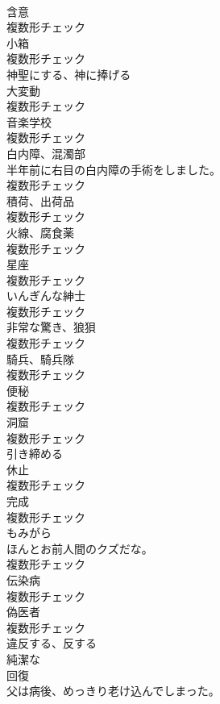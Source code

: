 \documentclass[8pt]{extreport}
\begin{document}
\begin{CJK}{UTF8}{min}
\\	[名詞]	含意	
\\	複数形チェック
\\	[名詞]	小箱	
\\	複数形チェック
\\	[動詞]	神聖にする、神に捧げる	
\\	[名詞]	大変動	
\\	複数形チェック
\\	[名詞]	音楽学校	
\\	複数形チェック
\\	[名詞]	白内障、混濁部	
\\	半年前に右目の白内障の手術をしました。	
\\	複数形チェック
\\	[名詞]	積荷、出荷品	
\\	複数形チェック
\\	[名詞]	火線、腐食薬	
\\	複数形チェック
\\	[名詞]	星座	
\\	複数形チェック
\\	[名詞]	いんぎんな紳士	
\\	複数形チェック
\\	[名詞]	非常な驚き、狼狽	
\\	複数形チェック
\\	[名詞]	騎兵、騎兵隊	
\\	複数形チェック
\\	[名詞]	便秘	
\\	複数形チェック
\\	[名詞]	洞窟	
\\	複数形チェック
\\	[動詞]	引き締める	
\\	[名詞]	休止	
\\	複数形チェック
\\	[名詞]	完成	
\\	複数形チェック
\\	[名詞]	もみがら	
\\	ほんとお前人間のクズだな。	
\\	複数形チェック
\\	[名詞]	伝染病	
\\	複数形チェック
\\	[名詞]	偽医者	
\\	複数形チェック
\\	[動詞]	違反する、反する	
\\	[形容詞]	純潔な	
\\	[名詞]	回復	
\\	父は病後、めっきり老け込んでしまった。	

\end{CJK}
\end{document}
